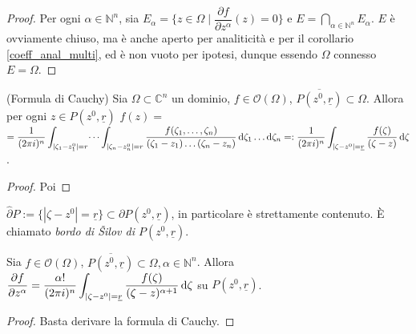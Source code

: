 \begin{proof}
  Per ogni $\alpha \in \mathbb{N}^n$, sia $E_\alpha=\{z \in \Omega \mid \dfrac{\partial f}{\partial z^\alpha}(z)=0\}$ e $\displaystyle E=\bigcap_{\alpha \in \mathbb{N}^n} E_\alpha$.
  $E$ è ovviamente chiuso, ma è anche aperto per analiticità e per il corollario \ref{coeff_anal_multi}, ed è non vuoto per ipotesi, dunque essendo $\Omega$ connesso $E=\Omega$.
\end{proof}

\begin{prop}
  (Formula di Cauchy) Sia $\Omega \subset \mathbb{C}^n$ un dominio, $f \in \mathcal{O}(\Omega)$, $\overline{P(z^0,\underline{r})} \subset \Omega$. Allora per ogni $z \in P(z^0, \underline{r})$ $\displaystyle f(z)=$\\
  $\displaystyle =\dfrac{1}{(2\pi i)^n} \int_{|\zeta_1-z_1^0|=r}\dots\int_{|\zeta_n-z_n^0|=r} \frac{f(\zeta_1,\dots,\zeta_n)}{(\zeta_1-z_1)\dots(\zeta_n-z_n)}\mathop{}\!\mathrm{d}\zeta_1\dots\mathop{}\!\mathrm{d}\zeta_n=: \dfrac{1}{(2\pi i)^n} \int_{|\zeta-z^0|=\underline{r}} \dfrac{f(\zeta)}{(\zeta-z)}\mathop{}\!\mathrm{d} \zeta$.
\end{prop}

\begin{proof}
  Poi
\end{proof}

\begin{oss}
  $\hat{\partial}P:=\{|\zeta-z^0|=\underline{r}\} \subset \partial P(z^0, \underline{r})$, in particolare è strettamente contenuto. È chiamato \textit{bordo di Šilov di $P(z^0, \underline{r})$}.
\end{oss}

\begin{cor}
  Sia $f \in \mathcal{O}(\Omega)$, $\overline{P(z^0, \underline{r})} \subset \Omega, \alpha \in \mathbb{N}^n$. Allora $\displaystyle \frac{\partial f}{\partial z^\alpha}=\dfrac{\alpha!}{(2\pi i)^n} \int_{|\zeta-z^0|=\underline{r}} \frac{f(\zeta)}{(\zeta-z)^{\alpha+1}}\mathop{}\!\mathrm{d} \zeta$ su $P(z^0, \underline{r})$.
\end{cor}

\begin{proof}
  Basta derivare la formula di Cauchy.
\end{proof}
